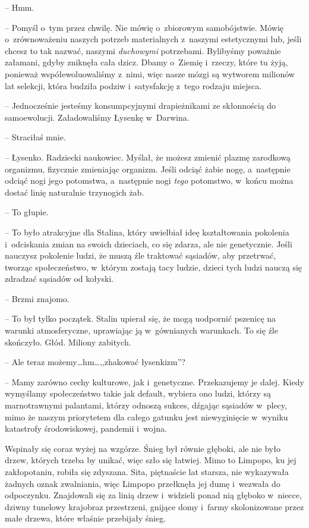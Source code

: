 \documentclass[oneside,polish,11pt,sfheadings]{mwbk}
\begin{document}
-- Hmm.

-- Pomyśl o~tym przez chwilę. Nie mówię o~zbiorowym samobójstwie. Mówię o~zrównoważeniu naszych potrzeb materialnych z~naszymi estetycznymi lub,
jeśli chcesz to tak nazwać, naszymi \textit{duchowymi} potrzebami.
Bylibyśmy poważnie załamani, gdyby zniknęła cała dzicz. Dbamy o~Ziemię i~rzeczy, które tu żyją, ponieważ współewoluowaliśmy z~nimi, więc nasze
mózgi są wytworem milionów lat selekcji, która budziła podziw i~satysfakcję z~tego rodzaju miejsca.

-- Jednocześnie jesteśmy konsumpcyjnymi drapieżnikami ze skłonnością do
samoewolucji. Załadowaliśmy Łysenkę w~Darwina.

-- Straciłaś mnie.

-- Łysenko. Radziecki naukowiec. Myślał, że możesz zmienić plazmę
zarodkową organizmu, fizycznie zmieniając organizm. Jeśli odciąć żabie
nogę, a~następnie odciąć nogi jego potomstwa, a~następnie nogi
\textit{tego} potomstwo, w~końcu można dostać linię naturalnie trzynogich
żab.

-- To głupie.

-- To było atrakcyjne dla Stalina, który uwielbiał ideę kształtowania
pokolenia i~odciskania zmian na swoich dzieciach, co się zdarza, ale nie
genetycznie. Jeśli nauczysz pokolenie ludzi, że muszą źle traktować
sąsiadów, aby przetrwać, tworząc społeczeństwo, w~którym zostają tacy
ludzie, dzieci tych ludzi nauczą się zdradzać sąsiadów od kołyski.

-- Brzmi znajomo.

-- To był tylko początek. Stalin upierał się, że mogą uodpornić pszenicę
na warunki atmosferyczne, uprawiając ją w~gównianych warunkach. To się
źle skończyło. Głód. Miliony zabitych.

-- Ale teraz możemy\ldots  hm\ldots  ,,zhakować łysenkizm''?

-- Mamy zarówno cechy kulturowe, jak i~genetyczne. Przekazujemy je dalej.
Kiedy wymyślamy społeczeństwo takie jak default, wybiera ono ludzi,
którzy są marnotrawnymi palantami, którzy odnoszą sukces, dźgając
sąsiadów w~plecy, mimo że naszym priorytetem dla całego gatunku jest
niewyginięcie w~wyniku katastrofy środowiskowej, pandemii i~wojna.

Wspinały się coraz wyżej na wzgórze. Śnieg był równie głęboki, ale nie
było drzew, których trzeba by unikać, więc szło się łatwiej. Mimo to
Limpopo, ku jej zakłopotaniu, robiła się zdyszana. Sita, piętnaście lat
starsza, nie wykazywała żadnych oznak zwalniania, więc Limpopo
przełknęła jej dumę i~wezwała do odpoczynku. Znajdowali się za linią
drzew i~widzieli ponad nią głęboko w~niecce, dziwny tunelowy krajobraz
przestrzeni, gnijące domy i~farmy skolonizowane przez małe drzewa, które
właśnie przebijały śnieg.
\end{document}
